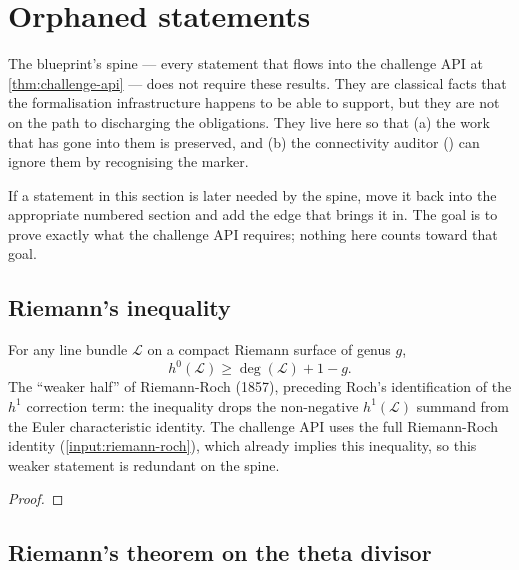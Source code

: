 \section{Orphaned statements}
\label{sec:orphaned-statements}

The blueprint's spine --- every statement that flows into the challenge API
at \ref{thm:challenge-api} --- does not require these results. They are
classical facts that the formalisation infrastructure happens to be able
to support, but they are not on the path to discharging the
 obligations. They live here so that (a)
the work that has gone into them is preserved, and (b) the connectivity
auditor () can ignore them by
recognising the  marker.

If a statement in this section is later needed by the spine, move it back
into the appropriate numbered section and add the 
edge that brings it in. The goal is to prove exactly what the challenge
API requires; nothing here counts toward that goal.

\subsection{Riemann's inequality}

\begin{theorem}
\label{thm:riemann-inequality}
For any line bundle \(\mathcal{L}\) on a compact Riemann surface of
genus \(g\),
\[
  h^{0}(\mathcal{L}) \ge \deg(\mathcal{L}) + 1 - g .
\]
The ``weaker half'' of Riemann-Roch (1857), preceding Roch's identification
of the \(h^{1}\) correction term: the inequality drops the non-negative
\(h^{1}(\mathcal{L})\) summand from the Euler characteristic identity.
The challenge API uses the full Riemann-Roch identity
(\ref{input:riemann-roch}), which already implies this inequality, so
this weaker statement is redundant on the spine.
\leanok
\end{theorem}
\begin{proof}\leanok\end{proof}

\subsection{Riemann's theorem on the theta divisor}

